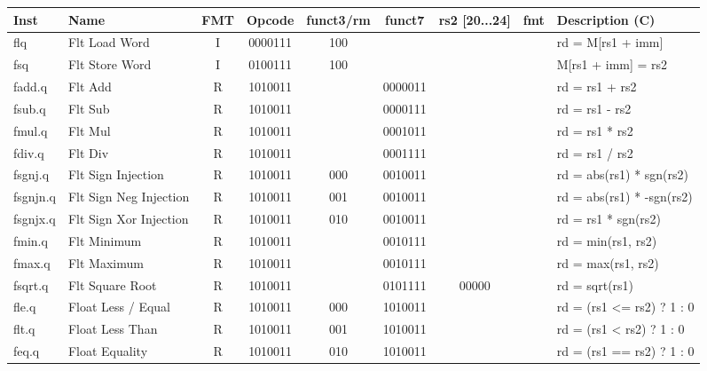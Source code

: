 \begin{center}
\begin{tabular}
{T | l | c | c | c | c | c | c | T } \hline
\rm Inst  & Name                  & FMT   & \rm Opcode & \rm funct3/rm & \rm funct7 & \rm rs2 [20...24] & \rm fmt & \rm Description (C)         \\ \hline
flq       & Flt Load Word         & I     & 0000111    & 100    &        &        & & rd = M[rs1 + imm]    \\
fsq       & Flt Store Word        & I     & 0100111    & 100    &        &        & & M[rs1 + imm] = rs2   \\
\hline
fadd.q    & Flt Add               & R     & 1010011    &        & 0000011 &        & & rd = rs1 + rs2       \\
fsub.q    & Flt Sub               & R     & 1010011    &        & 0000111 &        & & rd = rs1 - rs2       \\
fmul.q    & Flt Mul               & R     & 1010011    &        & 0001011 &        & & rd = rs1 * rs2       \\
fdiv.q    & Flt Div               & R     & 1010011    &        & 0001111 &        & & rd = rs1 / rs2       \\
fsgnj.q   & Flt Sign Injection    & R     & 1010011    & 000    & 0010011 &        & & rd = abs(rs1) * sgn(rs2) \\
fsgnjn.q  & Flt Sign Neg Injection& R     & 1010011    & 001    & 0010011 &        & & rd = abs(rs1) * -sgn(rs2) \\
fsgnjx.q  & Flt Sign Xor Injection& R     & 1010011    & 010    & 0010011 &        & & rd = rs1 * sgn(rs2)  \\
fmin.q    & Flt Minimum           & R     & 1010011    &        & 0010111 &        & & rd = min(rs1, rs2)   \\
fmax.q    & Flt Maximum           & R     & 1010011    &        & 0010111 &        & & rd = max(rs1, rs2)   \\
fsqrt.q   & Flt Square Root       & R     & 1010011    &        & 0101111 & 00000  & & rd = sqrt(rs1)       \\
\hline
fle.q     & Float Less / Equal    & R     & 1010011    & 000    & 1010011 &        & & rd = (rs1 <= rs2) ? 1 : 0\\
flt.q     & Float Less Than       & R     & 1010011    & 001    & 1010011 &        & & rd = (rs1 <  rs2) ? 1 : 0 \\
feq.q     & Float Equality        & R     & 1010011    & 010    & 1010011 &        & & rd = (rs1 == rs2) ? 1 : 0 \\

\end{tabular}
\end{center}
